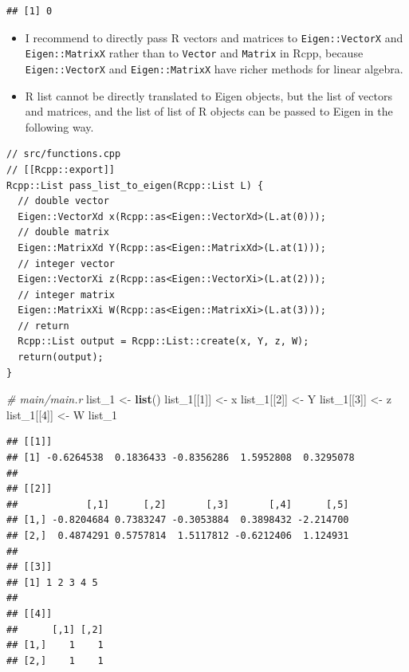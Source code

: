 \documentclass[]{book}
\newenvironment{Shaded}{\begin{snugshade}}{\end{snugshade}}
\newcommand{\KeywordTok}[1]{\textcolor[rgb]{0.13,0.29,0.53}{\textbf{#1}}}
\newcommand{\DecValTok}[1]{\textcolor[rgb]{0.00,0.00,0.81}{#1}}
\newcommand{\StringTok}[1]{\textcolor[rgb]{0.31,0.60,0.02}{#1}}
\newcommand{\CommentTok}[1]{\textcolor[rgb]{0.56,0.35,0.01}{\textit{#1}}}
\newcommand{\NormalTok}[1]{#1}
\begin{document}
\begin{verbatim}
## [1] 0
\end{verbatim}

\begin{itemize}
\item
  I recommend to directly pass R vectors and matrices to
  \texttt{Eigen::VectorX} and \texttt{Eigen::MatrixX} rather than to
  \texttt{Vector} and \texttt{Matrix} in Rcpp, because
  \texttt{Eigen::VectorX} and \texttt{Eigen::MatrixX} have richer
  methods for linear algebra.
\item
  R list cannot be directly translated to Eigen objects, but the list of
  vectors and matrices, and the list of list of R objects can be passed
  to Eigen in the following way.
\end{itemize}

\begin{verbatim}
// src/functions.cpp
// [[Rcpp::export]]
Rcpp::List pass_list_to_eigen(Rcpp::List L) {
  // double vector
  Eigen::VectorXd x(Rcpp::as<Eigen::VectorXd>(L.at(0)));
  // double matrix
  Eigen::MatrixXd Y(Rcpp::as<Eigen::MatrixXd>(L.at(1)));
  // integer vector
  Eigen::VectorXi z(Rcpp::as<Eigen::VectorXi>(L.at(2)));
  // integer matrix
  Eigen::MatrixXi W(Rcpp::as<Eigen::MatrixXi>(L.at(3)));
  // return
  Rcpp::List output = Rcpp::List::create(x, Y, z, W);
  return(output);
}
\end{verbatim}

\begin{Shaded}
\begin{Highlighting}[]
\CommentTok{# main/main.r}
\NormalTok{list_}\DecValTok{1}\NormalTok{ <-}\StringTok{ }\KeywordTok{list}\NormalTok{()}
\NormalTok{list_}\DecValTok{1}\NormalTok{[[}\DecValTok{1}\NormalTok{]] <-}\StringTok{ }\NormalTok{x}
\NormalTok{list_}\DecValTok{1}\NormalTok{[[}\DecValTok{2}\NormalTok{]] <-}\StringTok{ }\NormalTok{Y}
\NormalTok{list_}\DecValTok{1}\NormalTok{[[}\DecValTok{3}\NormalTok{]] <-}\StringTok{ }\NormalTok{z}
\NormalTok{list_}\DecValTok{1}\NormalTok{[[}\DecValTok{4}\NormalTok{]] <-}\StringTok{ }\NormalTok{W}
\NormalTok{list_}\DecValTok{1}
\end{Highlighting}
\end{Shaded}

\begin{verbatim}
## [[1]]
## [1] -0.6264538  0.1836433 -0.8356286  1.5952808  0.3295078
## 
## [[2]]
##            [,1]      [,2]       [,3]       [,4]      [,5]
## [1,] -0.8204684 0.7383247 -0.3053884  0.3898432 -2.214700
## [2,]  0.4874291 0.5757814  1.5117812 -0.6212406  1.124931
## 
## [[3]]
## [1] 1 2 3 4 5
## 
## [[4]]
##      [,1] [,2]
## [1,]    1    1
## [2,]    1    1
\end{verbatim}
\end{document}
